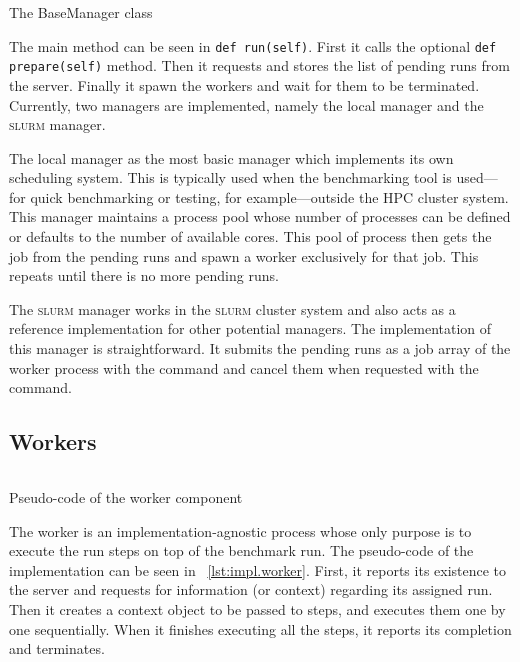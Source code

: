 \begin{listing}
    \inputminted[firstline=7,lastline=34]{python}{assets/listings/reprobench/reprobench/managers/base.py}
    \caption{The BaseManager class}
    \label{lst:impl.manager}
\end{listing}

The main method can be seen in \texttt{def run(self)}.
First it calls the optional \texttt{def prepare(self)} method.
Then it requests and stores the list of pending runs from the server.
Finally it spawn the workers and wait for them to be terminated.
Currently, two managers are implemented, namely the local manager and the \textsc{slurm} manager.

The local manager as the most basic manager which implements its own scheduling system.
This is typically used when the benchmarking tool is used---for quick benchmarking or testing, for example---outside the HPC cluster system.
This manager maintains a process pool whose number of processes can be defined or defaults to the number of available cores.
This pool of process then gets the job from the pending runs and spawn a worker exclusively for that job.
This repeats until there is no more pending runs.

The \textsc{slurm} manager works in the \textsc{slurm} cluster system and also acts as a reference implementation for other potential managers.
The implementation of this manager is straightforward.
It submits the pending runs as a job array of the worker process with the  command and cancel them when requested with the  command.

\subsection{Workers}
\label{sec:impl.workers}

\begin{listing}
    \inputminted{python}{assets/listings/pseudocodes/worker.py}
    \caption{Pseudo-code of the worker component}
    \label{lst:impl.worker}
\end{listing}

The worker is an implementation-agnostic process whose only purpose is to execute the run steps on top of the benchmark run.
The pseudo-code of the implementation can be seen in \lst~\ref{lst:impl.worker}.
First, it reports its existence to the server and requests for information (or context) regarding its assigned run.
Then it creates a context object to be passed to steps, and executes them one by one sequentially.
When it finishes executing all the steps, it reports its completion and terminates.

